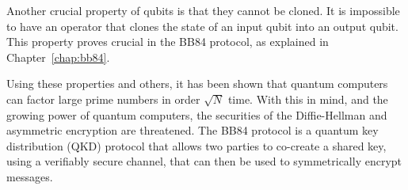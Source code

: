 Another crucial property of qubits is that they cannot be cloned.
It is impossible to have an operator that clones the state of an input qubit into an output qubit.
This property proves crucial in the BB84 protocol, as explained in Chapter~\ref{chap:bb84}.

Using these properties and others, it has been shown that quantum computers can factor large prime numbers in order $\sqrt{N}$ time.
With this in mind, and the growing power of quantum computers, the securities of the Diffie-Hellman and asymmetric encryption are threatened.
The BB84 protocol is a quantum key distribution (QKD) protocol that allows two parties to co-create a shared key, using a verifiably secure channel, that can then be used to symmetrically encrypt messages.